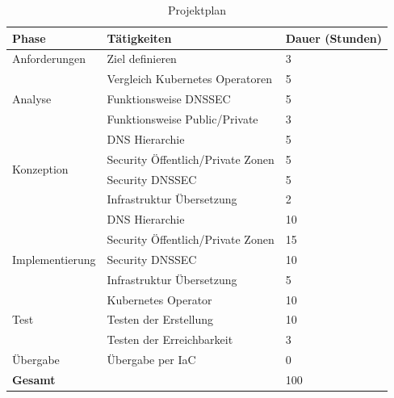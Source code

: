 \begin{table}[H]
  \begin{tabular}{ |p{3cm}|p{6cm}|p{3cm}| }
      \hline
      \textbf{Phase}                    &      \textbf{Tätigkeiten}                 &    \textbf{Dauer (Stunden)} \\
      \hline
      \hline
      Anforderungen                     &      Ziel definieren                      &    3               \\
      \hline
      \multirow{3}{*}{Analyse}          &      Vergleich Kubernetes Operatoren      &    5               \\
                                        &      Funktionsweise DNSSEC                &    5               \\
                                        &      Funktionsweise Public/Private        &    3               \\
      \hline
      \multirow{4}{*}{Konzeption}       &      DNS Hierarchie                       &    5               \\
                                        &      Security Öffentlich/Private Zonen    &    5               \\
                                        &      Security DNSSEC                      &    5               \\
                                        &      Infrastruktur Übersetzung            &    2               \\
      \hline
      \multirow{5}{*}{Implementierung}  &      DNS Hierarchie                       &    10              \\
                                        &      Security Öffentlich/Private Zonen    &    15              \\
                                        &      Security DNSSEC                      &    10              \\
                                        &      Infrastruktur Übersetzung            &    5               \\
                                        &      Kubernetes Operator                  &    10              \\
      \hline
      Test                              &      Testen der Erstellung                &    10              \\
                                        &      Testen der Erreichbarkeit            &    3               \\
      \hline
      Übergabe                          &      Übergabe per IaC                     &    0               \\
      \hline
      \hline
      \textbf{Gesamt}                   &                                           &    100             \\
      \hline
  \end{tabular}
  \caption[Projektplan]{Projektplan}
  \label{subsec:description:plan:table}
\end{table}

